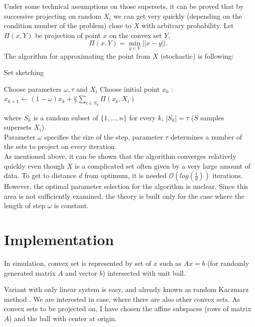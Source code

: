 \documentclass[11pt]{book}
\begin{document}
Under some technical assumptions on those supersets, it can be proved that by successive projecting on random $X_i$ we can get very quickly (depending on the condition number of the problem) close to $X$ with arbitrary probability. Let $\Pi(x, Y)$ be projection of point $x$ on the convex set $Y$, $$\Pi(x,Y) = \min_{y \in Y} ||x-y||.$$ The algorithm for approximating the point from $X$ (stochastic) is following:

\begin{algorithm}[H]
	\caption{Set sketching \cite{projectionFeasibility}\cite{kaczmarz}}
	\label{alg:set sketch}
	\begin{algorithmic}[1]
		\State Choose parameters $\omega, \tau$ and $ X_i$
		\State Choose initial point $x_0$
		:
		\State $x_{k+1} \leftarrow (1 - \omega)x_k + \frac{\omega}{\tau}\sum_{i \in S_k} \Pi(x_k, X_i )$
		\EndFor
	\end{algorithmic}
\end{algorithm}

\noindent
where $S_k$ is a random subset of $\{ 1, \dots , n\}$ for every $k$, $|S_k|=\tau$ ($S$ samples supersets $X_i$).\\

Parameter $\omega$ specifies the size of the step, parameter $\tau$ determines a number of the sets to project on every iteration.\\

As mentioned above, it can be shown that the algorithm converges relatively quickly even though $X$ is a complicated set often given by a very large amount of data. To get to distance $d$ from optimum, it is needed $\mathcal{O} (log(\frac{1}{d}))$ iterations\cite{sketchAndProject}\cite{kaczmarz}.  However, the optimal parameter selection for the algorithm is unclear. Since this area is not sufficiently examined, the theory is built only for the case where the length of step $\omega$ is constant.\\

\section{Implementation}

In simulation, convex set is represented by set of $x$ such as $Ax=b$ (for randomly generated matrix $A$ and vector $b$) intersected with unit ball.

Variant with only linear system is easy, and already known as random Kaczmarz method \cite{kaczmarz} \cite{iterativeLinearSystems}. We are interested in case, where there are also other convex sets. As convex sets to be projected on, I have chosen the affine subspaces (rows of matrix $A$) and the ball with center at origin.
\end{document}
